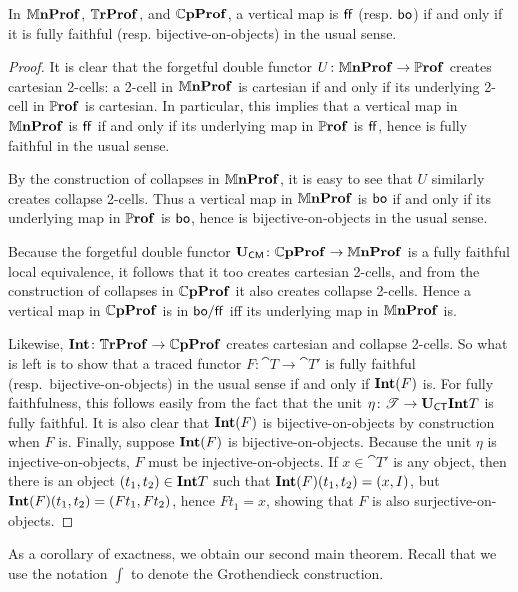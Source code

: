 \documentclass[11pt,oneside,article]{memoir}
\begin{document}
\begin{proposition}
    \label{prop:(bo,ff)_really_is}
  In $\mathbb{M}\mathbf{nProf}$, $\mathbb{T}\mathbf{rProf}$, and $\mathbb{C}\mathbf{pProf}$, a vertical map is $\mathsf{ff}$ (resp. $\mathsf{bo}$) if and only if
  it is fully faithful (resp. bijective-on-objects) in the usual sense.
\end{proposition}
\begin{proof}
  It is clear that the forgetful double functor $U\colon\mathbb{M}\mathbf{nProf}\to\mathbb{P}\mathbf{rof}$ creates cartesian 2-cells: a
  2-cell in $\mathbb{M}\mathbf{nProf}$ is cartesian if and only if its underlying 2-cell in $\mathbb{P}\mathbf{rof}$ is cartesian.
  In particular, this implies that a vertical map in $\mathbb{M}\mathbf{nProf}$ is $\mathsf{ff}$ if and only if its
  underlying map in $\mathbb{P}\mathbf{rof}$ is $\mathsf{ff}$, hence is fully faithful in the usual sense.

  By the construction of collapses in $\mathbb{M}\mathbf{nProf}$, it is easy to see that $U$ similarly creates
  collapse 2-cells. Thus a vertical map in $\mathbb{M}\mathbf{nProf}$ is $\mathsf{bo}$ if and only if its underlying map in
  $\mathbb{P}\mathbf{rof}$ is $\mathsf{bo}$, hence is bijective-on-objects in the usual sense.

  Because the forgetful double functor $\mathbf{U}_{\mathsf{CM}}\colon\mathbb{C}\mathbf{pProf}\to\mathbb{M}\mathbf{nProf}$ is a fully faithful local
  equivalence, it follows that it too creates cartesian 2-cells, and from the construction of
  collapses in $\mathbb{C}\mathbf{pProf}$ it also creates collapse 2-cells. Hence a vertical map in $\mathbb{C}\mathbf{pProf}$
  is in $\mathsf{bo}/\mathsf{ff}$ iff its underlying map in $\mathbb{M}\mathbf{nProf}$ is.

  Likewise, $\mathbf{Int}\colon\mathbb{T}\mathbf{rProf}\to\mathbb{C}\mathbf{pProf}$ creates cartesian and collapse 2-cells. So what is
  left is to show that a traced functor $F\colon\cat{T}\to\cat{T}'$ is fully faithful (resp.\
  bijective-on-objects) in the usual sense if and only if $\mathbf{Int}(F)$ is. For fully faithfulness, this
  follows easily from the fact that the unit $\eta\colon\mathscr{T}\to\mathbf{U}_{\mathsf{CT}}\mathbf{Int} T$ is fully faithful. It
  is also clear that $\mathbf{Int}(F)$ is bijective-on-objects by construction when $F$ is. Finally, suppose
  $\mathbf{Int}(F)$ is bijective-on-objects. Because the unit $\eta$ is injective-on-objects, $F$ must be
  injective-on-objects. If $x\in\cat{T}'$ is any object, then there is an object $(t_1,t_2)\in\mathbf{Int}
  T$ such that $\mathbf{Int}(F)(t_1,t_2)=(x,I)$, but $\mathbf{Int}(F)(t_1,t_2)=(Ft_1,Ft_2)$, hence $Ft_1=x$, showing
  that $F$ is also surjective-on-objects.
\end{proof}

As a corollary of exactness, we obtain our second main theorem. Recall that we use the notation $\int$ to denote
the Grothendieck construction.
\end{document}
